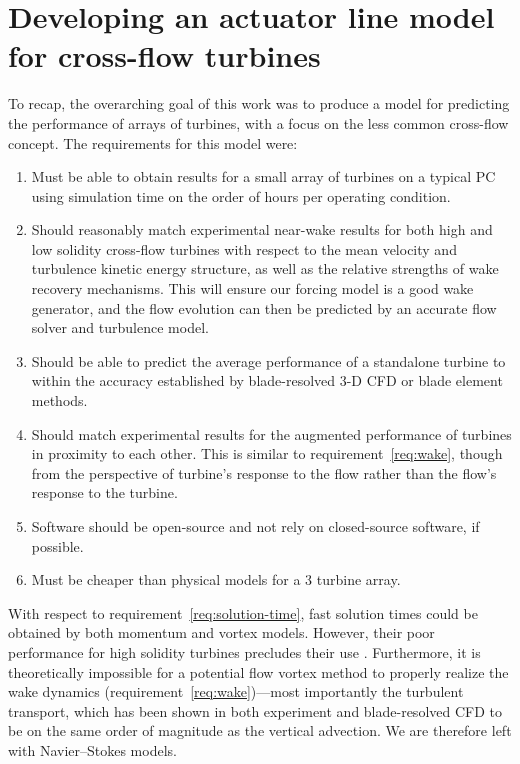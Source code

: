 \chapter{Developing an actuator line model for cross-flow turbines}

To recap, the overarching goal of this work was to produce a model for
predicting the performance of arrays of turbines, with a focus on the less
common cross-flow concept. The requirements for this model were:

\begin{enumerate}
    \item Must be able to obtain results for a small array of turbines on a
    typical PC using simulation time on the order of hours per operating
    condition.\label{req:solution-time}
    
    \item Should reasonably match experimental near-wake results for both high
    and low solidity cross-flow turbines with respect to the mean velocity and
    turbulence kinetic energy structure, as well as the relative strengths of
    wake recovery mechanisms. This will ensure our forcing model is a good wake
    generator, and the flow evolution can then be predicted by an accurate flow
    solver and turbulence model.\label{req:wake}
    
    \item Should be able to predict the average performance of a standalone
    turbine to within the accuracy established by blade-resolved 3-D CFD or
    blade element methods.
    
    \item Should match experimental results for the augmented performance of
    turbines in proximity to each other. This is similar to
    requirement~\ref{req:wake}, though from the perspective of turbine's
    response to the flow rather than the flow's response to the turbine.
    
    \item Software should be open-source and not rely on closed-source software,
    if possible.
    
    \item Must be cheaper than physical models for a 3 turbine array. 
\end{enumerate}

With respect to requirement~\ref{req:solution-time}, fast solution times could
be obtained by both momentum and vortex models. However, their poor performance
for high solidity turbines precludes their use \cite{Joo2015}. Furthermore, it
is theoretically impossible for a potential flow vortex method to properly
realize the wake dynamics (requirement~\ref{req:wake})---most importantly the
turbulent transport, which has been shown in both experiment and blade-resolved
CFD to be on the same order of magnitude as the vertical advection. We are
therefore left with Navier--Stokes models.

